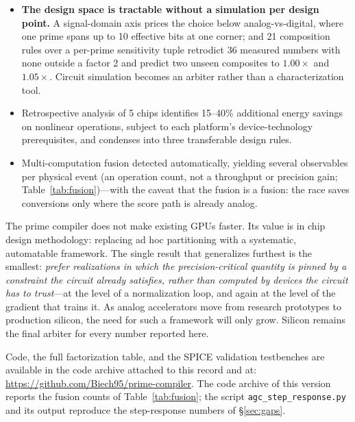 \documentclass[11pt]{article}
\begin{document}
\begin{itemize}[leftmargin=*]
\item \textbf{The design space is tractable without a simulation per design point.} A signal-domain axis prices the choice below analog-vs-digital, where one prime spans up to 10 effective bits at one corner; and 21 composition rules over a per-prime sensitivity tuple retrodict 36 measured numbers with none outside a factor 2 and predict two unseen composites to $1.00\times$ and $1.05\times$. Circuit simulation becomes an arbiter rather than a characterization tool.
\item Retrospective analysis of 5 chips identifies 15--40\% additional energy savings on nonlinear operations, subject to each platform's device-technology prerequisites, and condenses into three transferable design rules.
\item Multi-computation fusion detected automatically, yielding several observables per physical event (an operation count, not a throughput or precision gain; Table~\ref{tab:fusion})---with the caveat that the fusion is a fusion: the race saves conversions only where the score path is already analog.
\end{itemize}

The prime compiler does not make existing GPUs faster. Its value is in chip design methodology: replacing ad hoc partitioning with a systematic, automatable framework. The single result that generalizes furthest is the smallest: \textit{prefer realizations in which the precision-critical quantity is pinned by a constraint the circuit already satisfies, rather than computed by devices the circuit has to trust}---at the level of a normalization loop, and again at the level of the gradient that trains it. As analog accelerators move from research prototypes to production silicon, the need for such a framework will only grow. Silicon remains the final arbiter for every number reported here.

Code, the full factorization table, and the SPICE validation testbenches are available in the code archive attached to this record and at: \url{https://github.com/Biech95/prime-compiler}. The code archive of this version reports the fusion counts of Table~\ref{tab:fusion}; the script \texttt{agc\_step\_response.py} and its output reproduce the step-response numbers of \S\ref{sec:gaps}.
\end{document}
